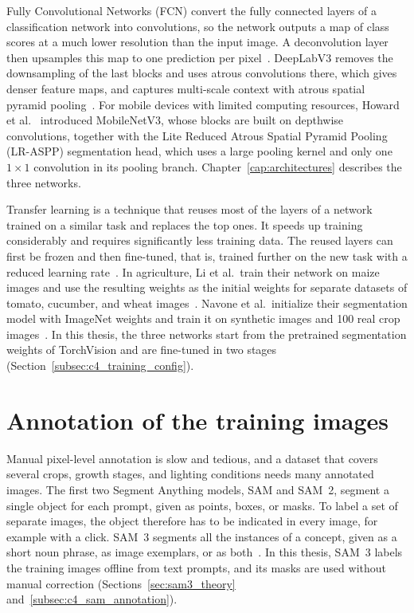 Fully Convolutional Networks (FCN) convert the fully connected layers of
a classification network into convolutions, so the network outputs a
map of class scores at a much lower resolution than the input image. A
deconvolution layer then upsamples this map
to one prediction per pixel~\cite{long2015fcn}. DeepLabV3 removes the downsampling of the last blocks and uses atrous
convolutions there, which gives denser feature maps, and captures
multi-scale context with atrous spatial pyramid
pooling~\cite{chen2017deeplab}. For mobile
devices with limited computing resources, Howard et
al.~\cite{howard2019mobilenetv3} introduced MobileNetV3, whose blocks are
built on depthwise convolutions, together with the Lite Reduced Atrous
Spatial Pyramid Pooling (LR-ASPP) segmentation head, which uses a large
pooling kernel and only one $1\times1$ convolution in its pooling branch.
Chapter~\ref{cap:architectures} describes the three networks.

Transfer learning is a technique that reuses most of the layers of a network trained on a
similar task and replaces the top ones. It speeds up training
considerably and requires significantly less training data. The reused
layers can first be frozen and then fine-tuned, that is, trained further
on the new task with a reduced learning
rate~\cite{geron2026handson}. In agriculture, Li et al.\ train
their network on maize images and use the resulting weights
as the initial weights for separate datasets of tomato, cucumber,
and wheat images~\cite{li2022multiroi}.
Navone et al.\ initialize their segmentation model with ImageNet weights
and train it on synthetic images and 100 real crop
images~\cite{navone2025gpsfree}. In this thesis,
the three networks start from the pretrained segmentation weights of
TorchVision and are fine-tuned in two stages
(Section~\ref{subsec:c4_training_config}).

\section{Annotation of the training images}
\label{sec:dataset_annotation}

Manual pixel-level annotation is slow and tedious, and a dataset that
covers several crops, growth stages, and lighting conditions needs many
annotated images. The first two Segment Anything models, SAM and SAM~2,
segment a single object for each prompt, given as points, boxes, or
masks. To label a set of separate images, the object therefore has to be
indicated in every image, for example with a click. SAM~3
segments all the instances of a concept, given as a short noun phrase,
as image exemplars, or as both~\cite{carion2026sam3}. In this thesis, SAM~3 labels the
training images offline from text prompts, and its masks are used
without manual correction (Sections~\ref{sec:sam3_theory}
and~\ref{subsec:c4_sam_annotation}).

